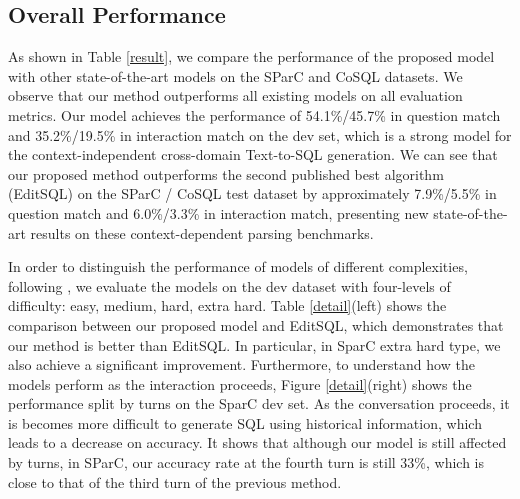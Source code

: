 \documentclass[letterpaper]{article} \usepackage{aaai21}  \usepackage{times}  \usepackage{helvet} \usepackage{courier}  \usepackage[hyphens]{url}  \usepackage{graphicx} \urlstyle{rm} \def\UrlFont{\rm}  \usepackage{natbib}  \usepackage{caption} \frenchspacing  \setlength{\pdfpagewidth}{8.5in}  \setlength{\pdfpageheight}{11in}
\begin{document}
\subsection{Overall Performance}
As shown in Table \ref{result}, we compare the performance of the proposed model with other state-of-the-art models on the SParC and CoSQL datasets. 
We observe that our method outperforms all existing models on all evaluation metrics. 
Our model achieves the performance of 54.1\%/45.7\% in question match and 35.2\%/19.5\% in interaction match on the dev set, which is a strong model for the context-independent cross-domain Text-to-SQL generation.
We can see that our proposed method outperforms the second published best algorithm (EditSQL) on the SParC / CoSQL test dataset by approximately 7.9\%/5.5\% in question match and 6.0\%/3.3\% in interaction match, presenting new state-of-the-art results on these context-dependent parsing benchmarks. 

In order to distinguish the performance of models of different complexities, following \cite{DBLP:conf/emnlp/YuZYYWLMLYRZR18}, we evaluate the models on the dev dataset with four-levels of difficulty: easy, medium, hard, extra hard. 
Table \ref{detail}(left) shows the comparison between our proposed model and EditSQL, which demonstrates that our method is better than EditSQL.
In particular, in SparC extra hard type, we also achieve a significant improvement. 
Furthermore, to understand how the models perform as the interaction proceeds, Figure \ref{detail}(right) shows the performance split by turns on the SparC dev set.
As the conversation proceeds, it is becomes more difficult to generate SQL using historical information, which leads to a decrease on accuracy.
It shows that although our model is still affected by turns, in SParC, our accuracy rate at the fourth turn is still 33\%, which is close to that of the third turn of the previous method.
\end{document}

